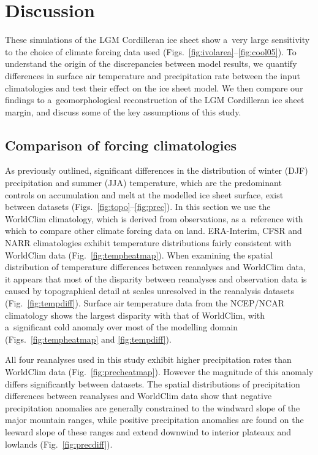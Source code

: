 \documentclass[tc, ms]{copernicus}
\begin{document}
\section{Discussion}
\label{sec:discussion}

These simulations of the LGM Cordilleran ice sheet show a~very large sensitivity to the choice of climate forcing data used (Figs.~\ref{fig:ivolarea}--\ref{fig:cool05}). To understand the origin of the discrepancies between model results, we quantify differences in surface air temperature and precipitation rate between the input climatologies and test their effect on the ice sheet model. We then compare our findings to a~geomorphological reconstruction of the LGM Cordilleran ice sheet margin, and discuss some of the key assumptions of this study.

\subsection{Comparison of forcing climatologies}

As previously outlined, significant differences in the distribution of winter (DJF) precipitation and summer (JJA) temperature, which are the predominant controls on accumulation and melt at the modelled ice sheet surface, exist between datasets (Figs.~\ref{fig:topo}--\ref{fig:prec}). In this section we use the WorldClim climatology, which is derived from observations, as a~reference with which to compare other climate forcing data on land. ERA-Interim, CFSR and NARR climatologies exhibit temperature distributions fairly consistent with WorldClim data (Fig.~\ref{fig:tempheatmap}). When examining the spatial distribution of temperature differences between reanalyses and WorldClim data, it appears that most of the disparity between reanalyses and observation data is caused by topographical detail at scales unresolved in the reanalysis datasets (Fig.~\ref{fig:tempdiff}). Surface air temperature data from the NCEP/NCAR climatology shows the largest disparity with that of WorldClim, with a~significant cold anomaly over most of the modelling domain (Figs.~\ref{fig:tempheatmap} and \ref{fig:tempdiff}).

All four reanalyses used in this study exhibit higher precipitation rates than WorldClim data (Fig.~\ref{fig:precheatmap}). However the magnitude of this anomaly differs significantly between datasets. The spatial distributions of precipitation differences between reanalyses and WorldClim data show that negative precipitation anomalies are generally constrained to the windward slope of the major mountain ranges, while positive precipitation anomalies are found on the leeward slope of these ranges and extend downwind to interior plateaux and lowlands (Fig.~\ref{fig:precdiff}).
\end{document}
